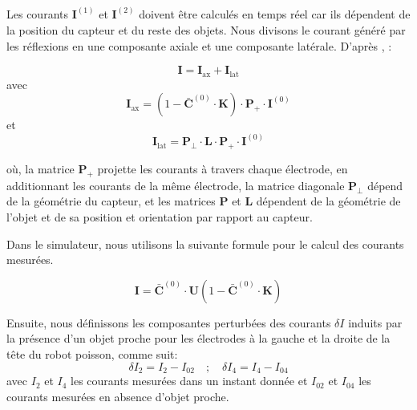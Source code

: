 Les courants $\mathbf{I}^{(1)}$ et $\mathbf{I}^{(2)}$ doivent être calculés en temps réel car ils dépendent de la position du capteur et du reste des objets. Nous divisons le courant généré par les réflexions en une composante axiale et une composante latérale. D'après \cite{Boyer2012}, : 

\begin{equation}
    \mathbf{I} = \mathbf{I}_{\text{ax}} + \mathbf{I}_{\text{lat}}
\end{equation}
avec
\begin{equation}
    \mathbf{I}_{\text{ax}} = \left ( 1- \bar{\mathbf{C}}^{(0)} \cdot \mathbf{K} \right ) \cdot \mathbf{P}_{+} \cdot \mathbf{I}^{(0)}
\end{equation}
et 
\begin{equation}
    \mathbf{I}_{\text{lat}} = \mathbf{P}_{\perp} \cdot \mathbf{L} \cdot \mathbf{P}_{+} \cdot \mathbf{I}^{(0)}
\end{equation}

où, la matrice $\mathbf{P}_{+}$ projette les courants à travers chaque électrode, en additionnant les courants de la même électrode, la matrice diagonale $\mathbf{P}_{\perp}$ dépend de la géométrie du capteur, et les matrices $\mathbf{P}$ et $\mathbf{L}$ dépendent de la géométrie de l'objet et de sa position et orientation par rapport au capteur. 

Dans le simulateur, nous utilisons la suivante formule pour le calcul des courants mesurées. 

\begin{equation}
    \mathbf{I}= \bar{\mathbf{C}}^{(0)} \cdot \mathbf{U} \left ( 1- \bar{\mathbf{C}}^{(0)} \cdot \mathbf{K} \right )
\end{equation}

Ensuite, nous définissons les composantes perturbées des courants $\delta I$ induits par la présence d'un objet proche pour les électrodes à la gauche et la droite de la tête du robot poisson, comme suit: 
\begin{equation}
    \delta I_2 = I_2 - I_{02} \quad ; \quad \delta I_4 = I_4 - I_{04}
\end{equation}
avec $I_2$ et $I_4$ les courants mesurées dans un instant donnée et $I_{02}$ et $I_{04}$ les courants mesurées en absence d'objet proche. 

